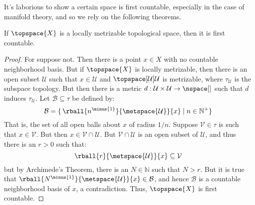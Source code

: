 \documentclass{article}                                                        %
\begin{document}
            It's laborious to show a certain space is first countable, especially in
            the case of manifold theory, and so we rely on the following theorems.
            \begin{theorem}
                \label{thm:Locally_Metrizable_is_First_Countable}%
                If $\topspace{X}$ is a locally metrizable topological space, then it
                is first countable.
            \end{theorem}
            \begin{proof}
                For suppose not. Then there is a point $x\in{X}$ with no countable
                neighborhood basis. But if $\topspace{X}$ is locally metrizable,
                then there is an open subset $\mathcal{U}$ such that
                $x\in\mathcal{U}$ and $\topspace[\mathcal{U}]{\mathcal{U}}$ is
                metrizable, where $\tau_{\mathcal{U}}$ is the subspace topology. But
                then there is a metric
                $d:\mathcal{U}\times\mathcal{U}\rightarrow\nspace[]$ such that
                $d$ induces $\tau_{\mathcal{U}}$. Let $\mathcal{B}\subseteq\tau$ be
                defined by:
                \begin{equation}
                    \mathcal{B}=\{\,\rball{n^{\minus{1}}}{\metspace{\mathcal{U}}}{x}
                        \;|\;n\in\mathbb{N}^{+}\}
                \end{equation}
                That is, the set of all open balls about $x$ of radius $1/n$.
                Suppose $\mathcal{V}\in\tau$ is such that $x\in\mathcal{V}$. But
                then $x\in\mathcal{V}\cap\mathcal{U}$. But
                $\mathcal{V}\cap\mathcal{U}$ is an open subset of $\mathcal{U}$, and
                thus there is an $r>0$ such that:
                \begin{equation}
                    \rball{r}{\metspace{\mathcal{U}}}{x}\subseteq\mathcal{V}
                \end{equation}
                but by Archimede's Theorem, there is an $N\in\mathbb{N}$ such that
                $N>r$. But it is true that
                $\rball{N^{\minus{1}}}{\metspace{\mathcal{U}}}{x}\in\mathcal{B}$,
                and hence $\mathcal{B}$ is a countable neighborhood basis of $x$,
                a contradiction. Thus, $\topspace{X}$ is first countable.
            \end{proof}
\end{document}
